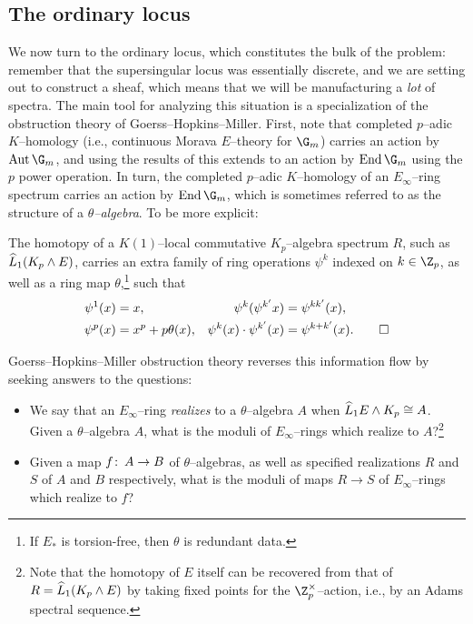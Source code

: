 \subsection*{The ordinary locus}

We now turn to the ordinary locus, which constitutes the bulk of the problem: remember that the supersingular locus was essentially discrete, and we are setting out to construct a sheaf, which means that we will be manufacturing a \emph{lot} of spectra.  The main tool for analyzing this situation is a specialization of the obstruction theory of Goerss--Hopkins--Miller.  First, note that completed \(p\)--adic \(K\)--homology (i.e., continuous Morava \(E\)--theory for \(\G_m\)) carries an action by \(\Aut \G_m\), and using the results of  this extends to an action by \(\End \G_m\) using the \(p\){\th} power operation.  In turn, the completed \(p\)--adic \(K\)--homology of an \(E_\infty\)--ring spectrum carries an action by \(\End \G_m\), which is sometimes referred to as the structure of a \textit{\(\theta\)--algebra}.  To be more explicit:
\begin{theorem}
The homotopy of a \(K(1)\)--local commutative \(K_p\)--algebra spectrum \(R\), such as \(\widehat L_1 (K_p \wedge E)\), carries an extra family of ring operations \(\psi^k\) indexed on \(k \in \Z_p\), as well as a ring map \(\theta\),\footnote{If \(E_*\) is torsion-free, then \(\theta\) is redundant data.} such that
\pushQED{\qed}
\begin{align*}
\psi^1(x) & = x, &
\psi^k (\psi^{k'} x) & = \psi^{kk'}(x), \\
\psi^p(x) & = x^p + p\theta(x), &
\psi^k(x) \cdot \psi^{k'}(x) & = \psi^{k + k'}(x). \qedhere
\end{align*}
\popQED
\end{theorem}
\noindent Goerss--Hopkins--Miller obstruction theory reverses this information flow by seeking answers to the questions:
\begin{itemize}
    \item We say that an \(E_\infty\)--ring \textit{realizes} to a \(\theta\)--algebra \(A\) when \(\widehat L_1 E \wedge K_p \cong A\).  Given a \(\theta\)--algebra \(A\), what is the moduli of \(E_\infty\)--rings which realize to \(A\)?\footnote{Note that the homotopy of \(E\) itself can be recovered from that of \(R = \widehat L_1 (K_p \wedge E)\) by taking fixed points for the \(\Z_p^\times\)--action, i.e., by an Adams spectral sequence.}
    \item Given a map \(f\colon\thinspace A \to B\) of \(\theta\)--algebras, as well as specified realizations \(R\) and \(S\) of \(A\) and \(B\) respectively, what is the moduli of maps \(R \to S\) of \(E_\infty\)--rings which realize to \(f\)?
\end{itemize}

